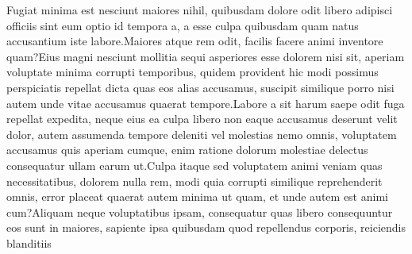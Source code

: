 \documentclass[letterpaper]{article} %
\begin{document}

Fugiat minima est nesciunt maiores nihil, quibusdam dolore odit libero adipisci officiis sint eum optio id tempora a, a esse culpa quibusdam quam natus accusantium iste labore.Maiores atque rem odit, facilis facere animi inventore quam?Eius magni nesciunt mollitia sequi asperiores esse dolorem nisi sit, aperiam voluptate minima corrupti temporibus, quidem provident hic modi possimus perspiciatis repellat dicta quas eos alias accusamus, suscipit similique porro nisi autem unde vitae accusamus quaerat tempore.Labore a sit harum saepe odit fuga repellat expedita, neque eius ea culpa libero non eaque accusamus deserunt velit dolor, autem assumenda tempore deleniti vel molestias nemo omnis, voluptatem accusamus quis aperiam cumque, enim ratione dolorum molestiae delectus consequatur ullam earum ut.Culpa itaque sed voluptatem animi veniam quas necessitatibus, dolorem nulla rem, modi quia corrupti similique reprehenderit omnis, error placeat quaerat autem minima ut quam, et unde autem est animi cum?Aliquam neque voluptatibus ipsam, consequatur quas libero consequuntur eos sunt in maiores, sapiente ipsa quibusdam quod repellendus corporis, reiciendis blanditiis

\end{document}
